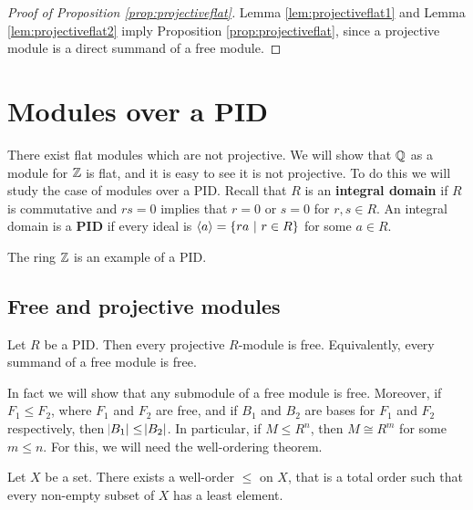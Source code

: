 \begin{proof}[Proof of Proposition \ref{prop:projectiveflat}]
Lemma \ref{lem:projectiveflat1} and Lemma \ref{lem:projectiveflat2} imply Proposition \ref{prop:projectiveflat}, since a projective module is a direct summand of a free module.
\end{proof}

\pagebreak

\section{Modules over a PID}

There exist flat modules which are not projective. We will show that $ \mathbb{Q} $ as a module for $ \mathbb{Z} $ is flat, and it is easy to see it is not projective. To do this we will study the case of modules over a PID. Recall that $ R $ is an \textbf{integral domain} if $ R $ is commutative and $ rs = 0 $ implies that $ r = 0 $ or $ s = 0 $ for $ r, s \in R $. An integral domain is a \textbf{PID} if every ideal is $ \abr{a} = \cbr{ra \st r \in R} $ for some $ a \in R $.

\begin{example*}
The ring $ \mathbb{Z} $ is an example of a PID.
\end{example*}

\subsection{Free and projective modules}

\begin{proposition}
Let $ R $ be a PID. Then every projective $ R $-module is free. Equivalently, every summand of a free module is free.
\end{proposition}

In fact we will show that any submodule of a free module is free. Moreover, if $ F_1 \le F_2 $, where $ F_1 $ and $ F_2 $ are free, and if $ B_1 $ and $ B_2 $ are bases for $ F_1 $ and $ F_2 $ respectively, then $ \abs{B_1} \le \abs{B_2} $. In particular, if $ M \le R^n $, then $ M \cong R^m $ for some $ m \le n $. For this, we will need the well-ordering theorem.

\begin{theorem}
Let $ X $ be a set. There exists a well-order $ \le $ on $ X $, that is a total order such that every non-empty subset of $ X $ has a least element.
\end{theorem}

